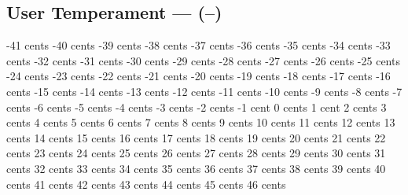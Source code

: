\subsection[User Temperament]{User Temperament --- \UiKey{\I}\UiKey{\SET}(--)}
-41 cents
-40 cents
-39 cents
-38 cents
-37 cents
-36 cents
-35 cents
-34 cents
-33 cents
-32 cents
-31 cents
-30 cents
-29 cents
-28 cents
-27 cents
-26 cents
-25 cents
-24 cents
-23 cents
-22 cents
-21 cents
-20 cents
-19 cents
-18 cents
-17 cents
-16 cents
-15 cents
-14 cents
-13 cents
-12 cents
-11 cents
-10 cents
-9  cents
-8  cents
-7  cents
-6  cents
-5  cents
-4  cents
-3  cents
-2  cents
-1  cent
0   cents
1   cent
2   cents
3   cents
4   cents
5   cents
6   cents
7   cents
8   cents
9   cents
10  cents
11  cents
12  cents
13  cents
14  cents
15  cents
16  cents
17  cents
18  cents
19  cents
20  cents
21  cents
22  cents
23  cents
24  cents
25  cents
26  cents
27  cents
28  cents
29  cents
30  cents
31  cents
32  cents
33  cents
34  cents
35  cents
36  cents
37  cents
38  cents
39  cents
40  cents
41  cents
42  cents
43  cents
44  cents
45  cents
46  cents
